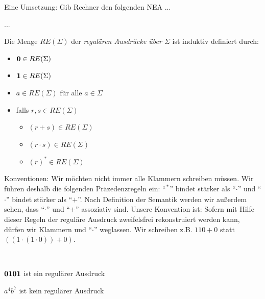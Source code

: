 Eine Umsetzung: Gib Rechner den folgenden NEA ...


...

\begin{Def}[name={[RE($\Sigma$)]}]
        Die Menge $RE(\Sigma)$ der \emph{regulären Ausdrücke über $\Sigma$} ist induktiv definiert durch:
        \begin{itemize}
        \item $\mathbf{0}\in RE(\Sigma)$
        \item $\mathbf{1}\in RE(\Sigma)$
        \item $a\in RE(\Sigma)$ für alle $a\in\Sigma$
        \item falls $r,s\in RE(\Sigma)$
                \begin{itemize}[label=\textbullet]
                \item $(r+s)\in RE(\Sigma)$
                \item $(r\cdot s)\in RE(\Sigma)$
                \item $(r)^*\in RE(\Sigma)$
                \qedhere
                \end{itemize}
        \end{itemize}
\end{Def}
Konventionen: Wir möchten nicht immer alle Klammern schreiben müssen. 
Wir führen deshalb die folgenden Präzedenzregeln ein: "`$\strut^*$"' bindet stärker als "`$\cdot$"' und "`$\cdot$"' bindet stärker als "`$+$"'.
Nach Definition der Semantik werden wir außerdem sehen, dass "`$\cdot$"' und "`$+$"' assoziativ sind. 
Unsere Konvention ist: 
Sofern mit Hilfe dieser Regeln der reguläre Ausdruck zweifelsfrei rekonstruiert werden kann, dürfen wir Klammern und "`$\cdot$"' weglassen.
Wir schreiben z.B. $110 + 0$ statt $((1\cdot (1\cdot 0)) + 0)$.

\begin{Bsp}~

$\mathbf{0}\mathbf{1}\mathbf{0}\mathbf{1}$ ist ein regulärer Ausdruck

$a^4b^7$ ist kein regulärer Ausdruck
\end{Bsp}


